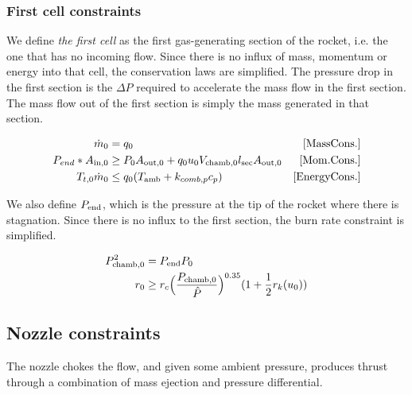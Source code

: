 \subsubsection{First cell constraints}

We define \textit{the first cell} as the first gas-generating section
of the rocket, i.e. the one that has no incoming flow.
Since there is no influx of mass, momentum or energy into that cell,
the conservation laws are simplified.
The pressure drop in the first section is the $\Delta P$ required
to accelerate the mass flow in the first section. The mass flow out of
the first section is simply the mass generated in that section.

\begin{align}
    \dot{m}_0 &= q_0 &\mathrm{[Mass Cons.]} \\
    P_{end}*A_{\rm{in}, 0} &\geq P_0 A_{\rm{out}, 0} + q_0 u_0 V_{\rm{chamb},0} l_{\rm{sec}} A_{\rm{out},0} &\mathrm{[Mom. Cons.]} \\
    T_{t, 0} \dot{m}_0 &\leq q_0 (T_{\rm{amb}} + k_{comb,p} c_{p}) &\mathrm{[Energy Cons.]}
\end{align}

We also define $P_{\rm{end}}$, which is the pressure at the tip of the rocket where there is stagnation.
Since there is no influx to the first section, the burn rate constraint is simplified.

\begin{align}
    P_{\rm{chamb}, 0}^2 &= P_{\rm{end}} P_0 \\
    r_{0} &\geq r_c  \Big(\frac{P_{\rm{chamb},0}}{\hat{P}}\Big)^{0.35} (1 + \frac{1}{2} r_k (u_{0}))
\end{align}

\subsection{Nozzle constraints}

The nozzle chokes the flow, and given some ambient pressure,
produces thrust through a combination of mass ejection and
pressure differential.







